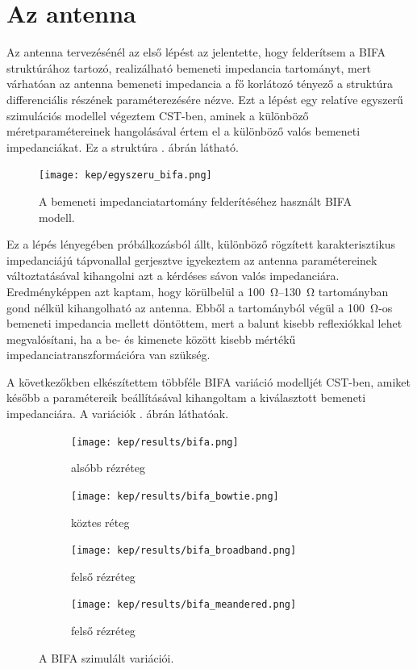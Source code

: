 \section{Az antenna}
	Az antenna tervezésénél az első lépést az jelentette, hogy felderítsem a BIFA struktúrához tartozó, realizálható bemeneti impedancia tartományt, mert várhatóan az antenna bemeneti impedancia a fő korlátozó tényező a struktúra differenciális részének paraméterezésére nézve. Ezt a lépést egy relatíve egyszerű szimulációs modellel végeztem CST-ben, aminek a különböző méretparamétereinek hangolásával értem el a különböző valós bemeneti impedanciákat. Ez a struktúra . ábrán látható.
\begin{figure}[h]
	\centering
	\texttt{[image: kep/egyszeru\_bifa.png]}
	\caption{A bemeneti impedanciatartomány felderítéséhez használt BIFA modell.}
	\label{fig:egyszeru_bifa}
\end{figure}
Ez a lépés lényegében próbálkozásból állt, különböző rögzített karakterisztikus impedanciájú tápvonallal gerjesztve igyekeztem az antenna paramétereinek változtatásával kihangolni azt a kérdéses sávon valós impedanciára. Eredményképpen azt kaptam, hogy körülbelül a \SIrange{100}{130}{\ohm} tartományban gond nélkül kihangolható az antenna. Ebből a tartományból végül a \SI{100}{\ohm}-os bemeneti impedancia mellett döntöttem, mert a balunt kisebb reflexiókkal lehet megvalósítani, ha a be- és kimenete között kisebb mértékű impedanciatranszformációra van szükség.
\par A következőkben elkészítettem többféle BIFA variáció modelljét CST-ben, amiket később a paramétereik beállításával kihangoltam a kiválasztott bemeneti impedanciára. A variációk . ábrán láthatóak.
\begin{figure}[h]
	\centering
	\begin{subfigure}[b]{0.48\textwidth}
		\centering
		\texttt{[image: kep/results/bifa.png]}
		\caption{alsóbb rézréteg}
	\end{subfigure}
	\hfill
	\begin{subfigure}[b]{0.48\textwidth}
		\centering
		\texttt{[image: kep/results/bifa\_bowtie.png]}
		\caption{köztes réteg}
	\end{subfigure}
	\hfill
	\begin{subfigure}[b]{0.48\textwidth}
		\centering
		\texttt{[image: kep/results/bifa\_broadband.png]}
		\caption{felső rézréteg}
	\end{subfigure}
	\hfill
	\begin{subfigure}[b]{0.48\textwidth}
		\centering
		\texttt{[image: kep/results/bifa\_meandered.png]}
		\caption{felső rézréteg}
	\end{subfigure}
	\caption{A BIFA szimulált variációi.}
	\label{fig:balun-kereszt}
\end{figure}
